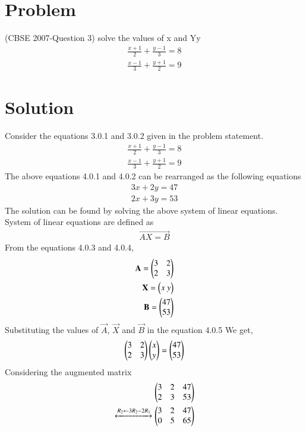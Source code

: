 \documentclass[journal,12pt,twocolumn]{IEEEtran}
\begin{document}
\section{Problem}
(CBSE 2007-Question 3)
solve the values of x and Yy
\begin{align}
\displaystyle\frac{x+1}{2}+\displaystyle\frac{y-1}{3}=8\\
\displaystyle\frac{x-1}{3}+\displaystyle\frac{y+1}{2}=9\end{align}
\section{Solution}
Consider the equations 3.0.1 and 3.0.2 given in the problem statement.
\begin{align}
\displaystyle\frac{x+1}{2}+\displaystyle\frac{y-1}{3}=8\\
\displaystyle\frac{x-1}{3}+\displaystyle\frac{y+1}{2}=9
\end{align}
The above equations 4.0.1 and 4.0.2 can be rearranged as the following equations
\begin{align}
3x+2y=47\\
2x+3y=53
\end{align}
The solution can be found by solving the above system of linear equations.\\ 
System of linear equations are defined as 
\begin{align}
\vec{AX=B}
\end{align}
From the equations 4.0.3 and 4.0.4, 
\begin{align}
\vec{A}= \myvec{3 &2\\2 & 3}\\
\medskip
\vec{X}= \myvec{ x\ y}\\
\medskip
\vec{B}= \myvec{47\\53}  
\end{align} 
Substituting the values of $\vec{A}$, $\vec{X}$ and $\vec{B}$ in the equation 4.0.5
We get,
\begin{align}
\begin{pmatrix}3&2\\2&3\end{pmatrix} \begin{pmatrix}x\\y\end{pmatrix}= \begin{pmatrix}47\\53\end{pmatrix}
\end{align}
Considering the augmented matrix 
 \begin{align}
 \begin{pmatrix}3&2&47\\2&3&53\end{pmatrix}
 \\
\xleftrightarrow[]{ R_2 \leftarrow 3R_2 - 2R_1}
 \begin{pmatrix}3&2&47\\0&5&65\end{pmatrix}
 \end{align}
\end{document}
